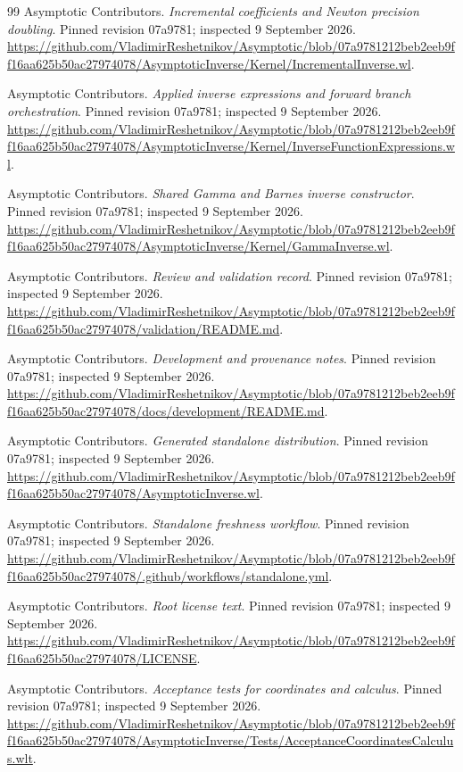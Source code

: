 \begin{thebibliography}{99}
Asymptotic Contributors. \emph{Incremental coefficients and Newton precision doubling}. Pinned revision 07a9781; inspected 9 September 2026.
\url{https://github.com/VladimirReshetnikov/Asymptotic/blob/07a9781212beb2eeb9ff16aa625b50ac27974078/AsymptoticInverse/Kernel/IncrementalInverse.wl}.

Asymptotic Contributors. \emph{Applied inverse expressions and forward branch orchestration}. Pinned revision 07a9781; inspected 9 September 2026.
\url{https://github.com/VladimirReshetnikov/Asymptotic/blob/07a9781212beb2eeb9ff16aa625b50ac27974078/AsymptoticInverse/Kernel/InverseFunctionExpressions.wl}.

Asymptotic Contributors. \emph{Shared Gamma and Barnes inverse constructor}. Pinned revision 07a9781; inspected 9 September 2026.
\url{https://github.com/VladimirReshetnikov/Asymptotic/blob/07a9781212beb2eeb9ff16aa625b50ac27974078/AsymptoticInverse/Kernel/GammaInverse.wl}.

Asymptotic Contributors. \emph{Review and validation record}. Pinned revision 07a9781; inspected 9 September 2026.
\url{https://github.com/VladimirReshetnikov/Asymptotic/blob/07a9781212beb2eeb9ff16aa625b50ac27974078/validation/README.md}.

Asymptotic Contributors. \emph{Development and provenance notes}. Pinned revision 07a9781; inspected 9 September 2026.
\url{https://github.com/VladimirReshetnikov/Asymptotic/blob/07a9781212beb2eeb9ff16aa625b50ac27974078/docs/development/README.md}.

Asymptotic Contributors. \emph{Generated standalone distribution}. Pinned revision 07a9781; inspected 9 September 2026.
\url{https://github.com/VladimirReshetnikov/Asymptotic/blob/07a9781212beb2eeb9ff16aa625b50ac27974078/AsymptoticInverse.wl}.

Asymptotic Contributors. \emph{Standalone freshness workflow}. Pinned revision 07a9781; inspected 9 September 2026.
\url{https://github.com/VladimirReshetnikov/Asymptotic/blob/07a9781212beb2eeb9ff16aa625b50ac27974078/.github/workflows/standalone.yml}.

Asymptotic Contributors. \emph{Root license text}. Pinned revision 07a9781; inspected 9 September 2026.
\url{https://github.com/VladimirReshetnikov/Asymptotic/blob/07a9781212beb2eeb9ff16aa625b50ac27974078/LICENSE}.

Asymptotic Contributors. \emph{Acceptance tests for coordinates and calculus}. Pinned revision 07a9781; inspected 9 September 2026.
\url{https://github.com/VladimirReshetnikov/Asymptotic/blob/07a9781212beb2eeb9ff16aa625b50ac27974078/AsymptoticInverse/Tests/AcceptanceCoordinatesCalculus.wlt}.


\end{thebibliography}
